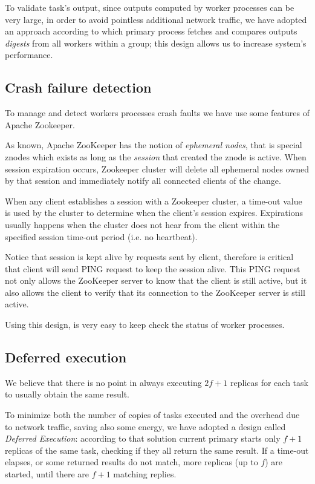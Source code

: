 \documentclass[sigchi]{acmart}
\begin{document}
To validate task's output, since outputs computed by worker processes can be very large, in order to avoid pointless additional network traffic, we have adopted an approach according to which primary process fetches and compares outputs \textit{digests} from all workers within a group; this design allows us to increase system's performance.

\subsection{Crash failure detection} To manage and detect workers processes crash faults we have use some features of Apache Zookeeper. 

As known, Apache ZooKeeper has the notion of \textit{ephemeral nodes}, that is special znodes which exists as long as the \textit{session} that created the znode is active. When session expiration occurs, Zookeeper cluster will delete all ephemeral nodes owned by that session and immediately notify all connected clients of the change.

When any client establishes a session with a Zookeeper cluster, a time-out value is used by the cluster to determine when the client's session expires. Expirations usually happens when the cluster does not hear from the client within the specified session time-out period (i.e. no heartbeat).

Notice that session is kept alive by requests sent by client, therefore is critical that client will send PING request to keep the session alive. This PING request not only allows the ZooKeeper server to know that the client is still active, but it also allows the client to verify that its connection to the ZooKeeper server is still active.

Using this design, is very easy to keep check the status of worker processes.

\subsection{Deferred execution} We believe that there is no point in always executing $2f + 1$ replicas for each task to usually obtain the same result. 

To minimize both the number of copies of tasks executed and the overhead due to network traffic, saving also some energy, we have adopted a design called \textit{Deferred Execution}: according to that solution current primary starts only $f + 1$ replicas of the same task, checking if they all return the same result. If a time-out elapses, or some returned results do not match, more replicas (up to $f$) are started, until there are $f + 1$ matching replies. 
\end{document}

